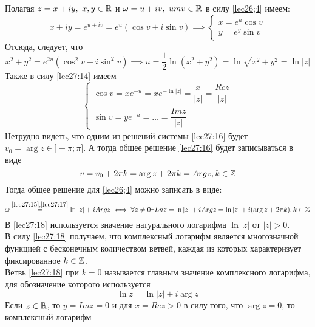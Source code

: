 \documentclass[../../main.tex]{subfiles}
\begin{document}
Полагая $ z = x + iy,\ x, y \in \mathbb{R} $ и $ \omega = u + iv,\ um v \in \mathbb{R} $
в силу \eqref{lec26;4} имеем:
\begin{equation}
\label{lec27:14}
x + iy = e^{u + iv} = e^u(\cos v + i\sin v) \implies
\begin{cases}
	x = e^u\cos v\\
	y = e^y\sin v
\end{cases}
\end{equation}
Отсюда, следует, что 
\begin{equation}
\label{lec27:15}
x^2 + y^2 = e^{2u}
(\cos^2 v + i\sin^2 v) \implies 
u = \dfrac{1}{2} \ln(x^2 + y^2) = 
\ln \sqrt{x^2 + y^2} = \ln|z|
\end{equation}
Также в силу \eqref{lec27:14} имеем
\begin{equation}
\label{lec27:16}
\begin{cases}
\cos v = xe^{-u} = xe^{-\ln|z|} = \dfrac{x}{|z|} = \dfrac{Re z}{|z|}\\
\sin v = ye^{-u} = \dots = \dfrac{Im z}{|z|}
\end{cases}
\end{equation}
Нетрудно видеть, что одним из решений системы \eqref{lec27:16} будет 
$ v_0 = \arg z \in ]-\pi; \pi] $. А тогда общее решение \eqref{lec27:16}
будет записываться в виде
\begin{equation}
\label{lec27:17}
v = v_0 + 2\pi k = \arg z + 2\pi k = Arg z, k \in \mathbb{Z}
\end{equation}
Тогда общее решение для \eqref{lec26;4} можно записать в виде:
\begin{equation}
\label{lec27:18}
\omega 
\stackrel{\eqref{lec27:15}, \eqref{lec27:17}}{=}
\ln |z| + i Arg z \iff
\forall z \neq 0 \exists Ln z = \ln |z| + i Arg z = 
\ln |z| + i(\arg z + 2\pi k), k \in \mathbb{Z}
\end{equation}
В \eqref{lec27:18} используется значение натурального логарифма
$ \ln|z| $ от $ |z| > 0 $.\\
В силу \eqref{lec27:18} получаем, что комплексный логарифм является 
многозначной функцией с бесконечным количеством ветвей, каждая из которых
характеризует фиксированное $ k\in\mathbb{Z} $.\\
Ветвь \eqref{lec27:18} при $ k = 0 $ называется главным значение комплексного
логарифма, для обозначение которого используется 
\begin{equation}
\label{lec27:19}
\ln z = \ln|z| + i\arg z
\end{equation}
Если $ z \in \mathbb{R} $, то $ y = Im z = 0 $ и для 
$ x = Re z > 0 $ в силу того, что $ \arg z = 0 $, то комплексный логарифм
\end{document}
